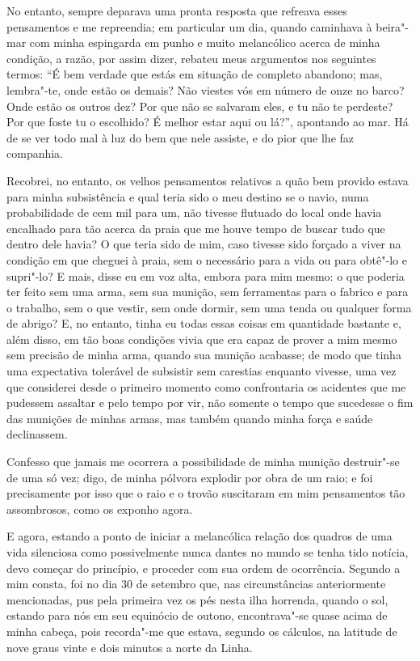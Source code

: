 No entanto, sempre deparava uma pronta resposta que refreava esses
pensamentos e me repreendia; em particular um dia, quando caminhava à
beira"-mar com minha espingarda em punho e muito melancólico acerca de
minha condição, a razão, por assim dizer, rebateu meus argumentos nos
seguintes termos: ``É bem verdade que estás em situação de completo
abandono; mas, lembra"-te, onde estão os demais? Não viestes vós em
número de onze no barco? Onde estão os outros dez? Por que não se
salvaram eles, e tu não te perdeste? Por que foste tu o escolhido? É
melhor estar aqui ou lá?'', apontando ao mar. Há de se ver todo mal à
luz do bem que nele assiste, e do pior que lhe faz companhia.

Recobrei, no entanto, os velhos pensamentos relativos a quão bem provido
estava para minha subsistência e qual teria sido o meu destino se o
navio, numa probabilidade de cem mil para um, não tivesse flutuado do
local onde havia encalhado para tão acerca da praia que me houve tempo
de buscar tudo que dentro dele havia? O que teria sido de mim, caso
tivesse sido forçado a viver na condição em que cheguei à praia, sem o
necessário para a vida ou para obtê"-lo e supri"-lo? E mais, disse eu em
voz alta, embora para mim mesmo: o que poderia ter feito sem uma arma,
sem sua munição, sem ferramentas para o fabrico e para o trabalho, sem o
que vestir, sem onde dormir, sem uma tenda ou qualquer forma de abrigo?
E, no entanto, tinha eu todas essas coisas em quantidade bastante e,
além disso, em tão boas condições vivia que era capaz de prover a mim
mesmo sem precisão de minha arma, quando sua munição acabasse; de modo
que tinha uma expectativa tolerável de subsistir sem carestias enquanto
vivesse, uma vez que considerei desde o primeiro momento como
confrontaria os acidentes que me pudessem assaltar e pelo tempo por vir,
não somente o tempo que sucedesse o fim das munições de minhas armas,
mas também quando minha força e saúde declinassem.

Confesso que jamais me ocorrera a possibilidade de minha munição
destruir"-se de uma só vez; digo, de minha pólvora explodir por obra de
um raio; e foi precisamente por isso que o raio e o trovão suscitaram em
mim pensamentos tão assombrosos, como os exponho agora.

E agora, estando a ponto de iniciar a melancólica relação dos quadros de
uma vida silenciosa como possivelmente nunca dantes no mundo se tenha
tido notícia, devo começar do princípio, e proceder com sua ordem de
ocorrência. Segundo a mim consta, foi no dia 30 de setembro que, nas
circunstâncias anteriormente mencionadas, pus pela primeira vez os pés
nesta ilha horrenda, quando o sol, estando para nós em seu equinócio de
outono, encontrava"-se quase acima de minha cabeça, pois recorda"-me que
estava, segundo os cálculos, na latitude de nove graus vinte e dois
minutos a norte da Linha.

